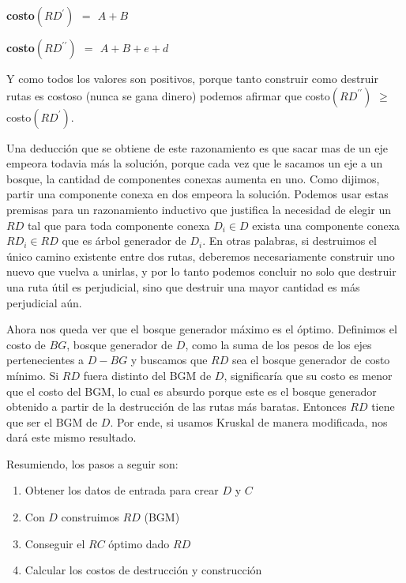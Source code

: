 \begin{center}
	\textbf{costo$(RD^{\prime})$ $=$ $A + B$}

	\textbf{costo$(RD^{\prime\prime})$ $=$ $A + B + e + d$}
	
\end{center}

Y como todos los valores son positivos, porque tanto construir como destruir rutas es costoso (nunca se gana dinero) podemos afirmar que
costo$(RD^{\prime\prime})$ $\geq$ costo$(RD^{\prime})$.

Una deducción que se obtiene de este razonamiento es que sacar mas de un eje empeora todavia más la solución, porque cada vez que le sacamos un eje a un bosque, la cantidad de componentes conexas aumenta en uno. Como dijimos, partir una componente conexa en dos empeora la solución. Podemos usar estas premisas para un razonamiento inductivo que justifica la necesidad de elegir un $RD$ tal que para toda componente conexa $D_i \in D$ exista una componente conexa $RD_i \in RD$ que es árbol generador de $D_i$. En otras palabras, si destruimos el único camino existente entre dos rutas, deberemos necesariamente construir uno nuevo que vuelva a unirlas, y por lo tanto podemos concluir no solo que destruir una ruta útil es perjudicial, sino que destruir una mayor cantidad es más perjudicial aún.

Ahora nos queda ver que el bosque generador máximo es el óptimo. Definimos el costo de $BG$, bosque generador de $D$, como la suma de los pesos de los ejes pertenecientes a $D - BG$ y buscamos que $RD$ sea el bosque generador de costo mínimo. Si $RD$ fuera distinto del BGM de $D$, significaría que su costo es menor que el costo del BGM, lo cual es absurdo porque este es el bosque generador obtenido a partir de la destrucción de las rutas más baratas. Entonces $RD$ tiene que ser el BGM de $D$. Por ende, si usamos Kruskal de manera modificada, nos dará este mismo resultado.

Resumiendo, los pasos a seguir son:

\begin{enumerate}
	\item Obtener los datos de entrada para crear $D$ y $C$

	\item Con $D$ construimos $RD$ (BGM) 

	\item Conseguir el $RC$ óptimo dado $RD$

	\item Calcular los costos de destrucción y construcción
\end{enumerate}

